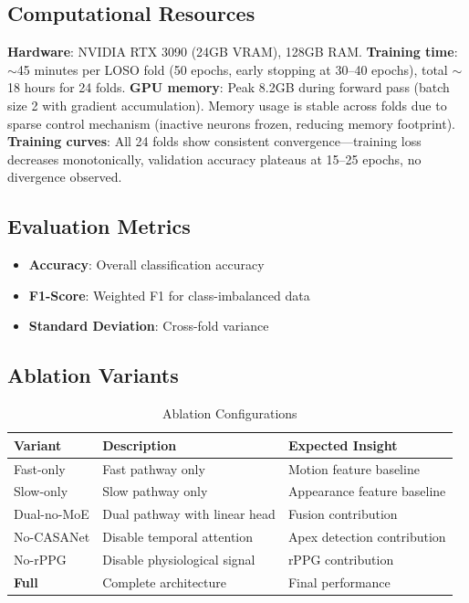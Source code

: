 \documentclass[preprint,12pt,authoryear]{elsarticle}
\begin{document}
\subsection{Computational Resources}

\textbf{Hardware}: NVIDIA RTX 3090 (24GB VRAM), 128GB RAM. \textbf{Training time}: $\sim$45 minutes per LOSO fold (50 epochs, early stopping at 30--40 epochs), total $\sim$18 hours for 24 folds. \textbf{GPU memory}: Peak 8.2GB during forward pass (batch size 2 with gradient accumulation). Memory usage is stable across folds due to sparse control mechanism (inactive neurons frozen, reducing memory footprint). \textbf{Training curves}: All 24 folds show consistent convergence---training loss decreases monotonically, validation accuracy plateaus at 15--25 epochs, no divergence observed.

\subsection{Evaluation Metrics}

\begin{itemize}
\item \textbf{Accuracy}: Overall classification accuracy
\item \textbf{F1-Score}: Weighted F1 for class-imbalanced data
\item \textbf{Standard Deviation}: Cross-fold variance
\end{itemize}

\subsection{Ablation Variants}

\begin{table}[htbp]
\centering
\caption{Ablation Configurations}
\label{tab:ablation_configs}
\begin{tabular}{lll}
\toprule
\textbf{Variant} & \textbf{Description} & \textbf{Expected Insight} \\
\midrule
Fast-only & Fast pathway only & Motion feature baseline \\
Slow-only & Slow pathway only & Appearance feature baseline \\
Dual-no-MoE & Dual pathway with linear head & Fusion contribution \\
No-CASANet & Disable temporal attention & Apex detection contribution \\
No-rPPG & Disable physiological signal & rPPG contribution \\
\textbf{Full} & Complete architecture & Final performance \\
\bottomrule
\end{tabular}
\end{table}
\end{document}
